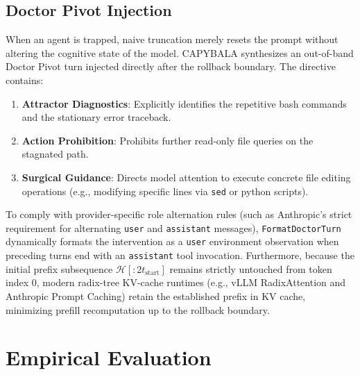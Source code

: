 \documentclass[journal]{IEEEtran}
\begin{document}
\subsection{Doctor Pivot Injection}
When an agent is trapped, naive truncation merely resets the prompt without altering the cognitive state of the model. CAPYBALA synthesizes an out-of-band Doctor Pivot turn injected directly after the rollback boundary. The directive contains:
\begin{enumerate}[leftmargin=12pt, topsep=2pt, itemsep=1pt]
    \item \textbf{Attractor Diagnostics}: Explicitly identifies the repetitive bash commands and the stationary error traceback.
    \item \textbf{Action Prohibition}: Prohibits further read-only file queries on the stagnated path.
    \item \textbf{Surgical Guidance}: Directs model attention to execute concrete file editing operations (e.g., modifying specific lines via \texttt{sed} or python scripts).
\end{enumerate}

To comply with provider-specific role alternation rules (such as Anthropic's strict requirement for alternating \texttt{user} and \texttt{assistant} messages), \texttt{FormatDoctorTurn} dynamically formats the intervention as a \texttt{user} environment observation when preceding turns end with an \texttt{assistant} tool invocation. Furthermore, because the initial prefix subsequence $\mathcal{H}[:2 t_{\text{start}}]$ remains strictly untouched from token index 0, modern radix-tree KV-cache runtimes (e.g., vLLM RadixAttention and Anthropic Prompt Caching) retain the established prefix in KV cache, minimizing prefill recomputation up to the rollback boundary.

\section{Empirical Evaluation}
\end{document}
